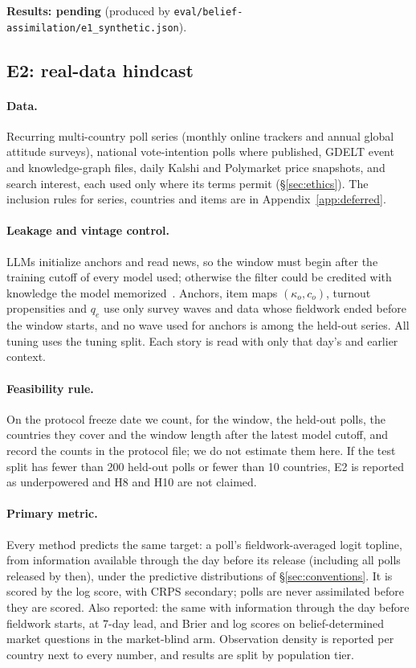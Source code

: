\documentclass[10pt]{article}
\theoremstyle{remark}
\newcommand{\pending}[1]{\textbf{Results: pending} (produced by \nolinkurl{#1}).}
\begin{document}
\pending{eval/belief-assimilation/e1_synthetic.json}

\subsection{E2: real-data hindcast}
\label{sec:e2}
\paragraph{Data.} Recurring multi-country poll series (monthly online trackers and annual global attitude surveys), national vote-intention polls where published, GDELT event and knowledge-graph files, daily Kalshi and Polymarket price snapshots, and search interest, each used only where its terms permit (\S\ref{sec:ethics}). The inclusion rules for series, countries and items are in Appendix~\ref{app:deferred}.

\paragraph{Leakage and vintage control.} LLMs initialize anchors and read news, so the window must begin after the training cutoff of every model used; otherwise the filter could be credited with knowledge the model memorized~\cite{halawi2024,douven2026}. Anchors, item maps $(\kappa_o,c_o)$, turnout propensities and $q_e$ use only survey waves and data whose fieldwork ended before the window starts, and no wave used for anchors is among the held-out series. All tuning uses the tuning split. Each story is read with only that day's and earlier context.

\paragraph{Feasibility rule.} On the protocol freeze date we count, for the window, the held-out polls, the countries they cover and the window length after the latest model cutoff, and record the counts in the protocol file; we do not estimate them here. If the test split has fewer than 200 held-out polls or fewer than 10 countries, E2 is reported as underpowered and H8 and H10 are not claimed.

\paragraph{Primary metric.} Every method predicts the same target: a poll's fieldwork-averaged logit topline, from information available through the day before its release (including all polls released by then), under the predictive distributions of \S\ref{sec:conventions}. It is scored by the log score, with CRPS secondary; polls are never assimilated before they are scored. Also reported: the same with information through the day before fieldwork starts, at 7-day lead, and Brier and log scores on belief-determined market questions in the market-blind arm. Observation density is reported per country next to every number, and results are split by population tier.
\end{document}
